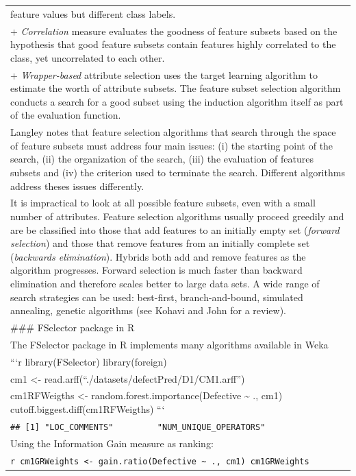 \documentclass[
]{book}
\begin{document}
\begin{longtable}[]{@{}
  >{\raggedleft\arraybackslash}p{}@{}}
feature values but different class labels. \\
+ \emph{Correlation} measure evaluates the goodness of feature subsets based on the hypothesis that good feature subsets contain features highly correlated to the class, yet uncorrelated to each other. \\
+ \emph{Wrapper-based} attribute selection uses the target learning algorithm to estimate the worth of attribute subsets. The feature subset selection algorithm conducts a search for a good subset using
the induction algorithm itself as part of the evaluation function. \\
Langley \citeyearpar{Lan94} notes that feature selection algorithms that search through the space of feature subsets must address four main issues: (i) the starting point of the search, (ii) the organization of the search, (iii) the evaluation of features subsets and (iv) the criterion used to terminate the search. Different algorithms address theses issues differently. \\
It is impractical to look at all possible feature subsets, even with a small number of attributes. Feature selection algorithms usually proceed greedily and are be classified into those that add features to an initially empty set (\emph{forward selection}) and those that remove features from an initially complete set (\emph{backwards elimination}). Hybrids both add and remove features as the algorithm progresses. Forward selection is much faster than backward elimination and therefore scales better to large data sets. A wide range of search strategies can be used: best-first, branch-and-bound, simulated annealing, genetic algorithms (see Kohavi and John \citeyearpar{KJ97} for a review). \\
\#\#\# FSelector package in R \\
The FSelector package in R implements many algorithms available in Weka \\
```r
library(FSelector)
library(foreign) \\
cm1 \textless- read.arff(``./datasets/defectPred/D1/CM1.arff'') \\
cm1RFWeigths \textless- random.forest.importance(Defective \textasciitilde{} ., cm1)
cutoff.biggest.diff(cm1RFWeigths)
``` \\
\texttt{\#\#\ {[}1{]}\ "LOC\_COMMENTS"\ \ \ \ \ \ \ \ \ "NUM\_UNIQUE\_OPERATORS"} \\
Using the Information Gain measure as ranking: \\
\texttt{r\ cm1GRWeights\ \textless{}-\ gain.ratio(Defective\ \textasciitilde{}\ .,\ cm1)\ cm1GRWeights} \\

\end{longtable}
\end{document}

